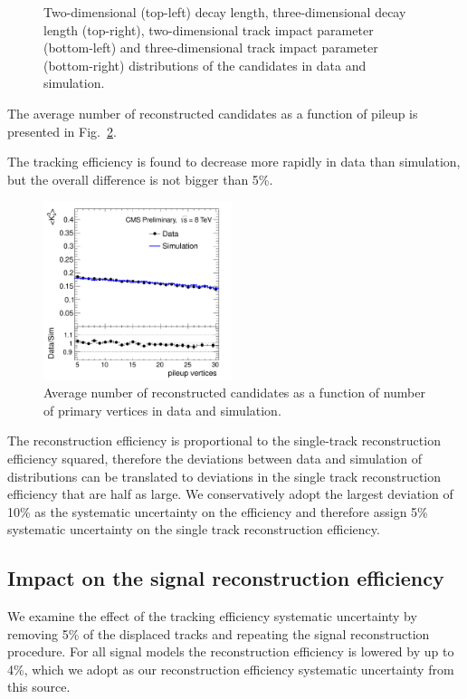 \begin{figure}[htbp]
\caption{Two-dimensional (top-left) decay length, three-dimensional decay length (top-right), two-dimensional track impact parameter (bottom-left) and three-dimensional track impact parameter (bottom-right) distributions 
of the \Kshort candidates in data and simulation. \label{fig:ksdisplacement}}
\end{figure}

The average number of 
reconstructed \Kshort candidates as a function of pileup is presented in Fig.~\ref{fig:kspileup}.

The tracking efficiency is found to decrease more rapidly in data than simulation, but the
overall difference is not bigger than 5\%.

\begin{figure}[htbp]
\centering
\includegraphics[width=0.49\textwidth]{plots/kshort/effnPV.pdf}
\caption{Average number of reconstructed \Kshort candidates as a function of number of primary vertices in data and simulation. \label{fig:kspileup}}
\end{figure}

The \Kshort reconstruction efficiency is proportional to the single-track reconstruction efficiency squared, 
therefore the deviations between data and simulation of \Kshort distributions can be translated to deviations in the single track reconstruction efficiency that are half as large. We conservatively adopt the largest deviation 
of 10\% as the systematic uncertainty on the \Kshort efficiency and therefore assign 5\% systematic uncertainty on the 
single track reconstruction efficiency. 

\subsection{Impact on the signal reconstruction efficiency}

We examine the effect of the tracking efficiency systematic uncertainty by removing 5\% of the displaced tracks 
 and repeating the signal reconstruction procedure.
For all signal models the reconstruction efficiency is lowered by up to 4\%, which we adopt as our reconstruction
efficiency systematic uncertainty from this source.  

